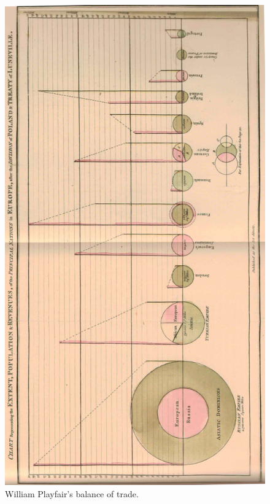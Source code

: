 \documentclass[print]{nuthesis}
\begin{document}
\begin{figure}[tbp]

{\centering \includegraphics[width=.75\linewidth,]{images/BalanceofTrade-crop} 

}

\caption{William Playfair's balance of trade.}\label{fig:william-playfair-trade}
\end{figure}
\end{document}
